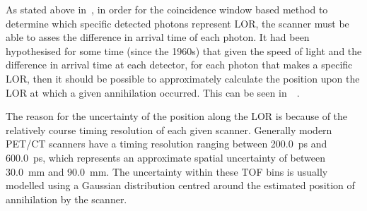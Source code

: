                 As stated above in~, in order for the coincidence window based method to determine which specific detected photons represent \gls{LOR}, the scanner must be able to asses the difference in arrival time of each photon. %
                It had been hypothesised for some time (since the 1960s) that given the speed of light and the difference in arrival time at each detector, for each photon that makes a specific \gls{LOR}, then it should be possible to approximately calculate the position upon the \gls{LOR} at which a given annihilation occurred. %
                This can be seen in~~.
                
                The reason for the uncertainty of the position along the \gls{LOR} is because of the relatively course timing resolution of each given scanner. Generally modern \gls{PET}/\gls{CT} scanners have a timing resolution ranging between \SI{200.0}{\pico\second} and \SI{600.0}{\pico\second}, which represents an approximate spatial uncertainty of between \SI{30.0}{\milli\metre} and \SI{90.0}{\milli\metre}. %
                The uncertainty within these \gls{TOF} bins is usually modelled using a Gaussian distribution centred around the estimated position of annihilation by the scanner.
                
                
